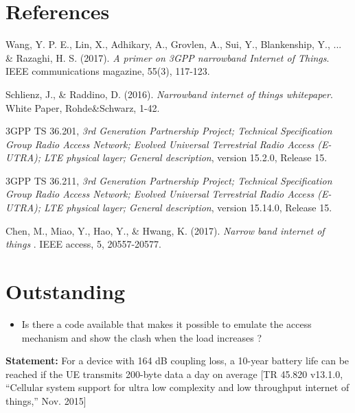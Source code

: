 \documentclass[10pt,a4paper,titlepage,twoside]{article}
\newcommand{\hghlght}[1]{\textbf{\color{ymaorng} #1}}
\newcommand{\point}[1]{\textbf{\color{ymared} #1}}
\begin{document}
\clearpage
\section{References}

\begin{thebibliography}{4}
Wang, Y. P. E., Lin, X., Adhikary, A., Grovlen, A., Sui, Y., Blankenship, Y., ... \& Razaghi, H. S. (2017).
\textit{A primer on 3GPP narrowband Internet of Things}. IEEE communications magazine, 55(3), 117-123.

Schlienz, J., \& Raddino, D. (2016).
\textit{Narrowband internet of things whitepaper}. White Paper, Rohde\&Schwarz, 1-42.

3GPP TS 36.201,
\textit{3rd Generation Partnership Project; Technical Specification Group Radio Access Network; Evolved Universal Terrestrial Radio Access (E-UTRA); LTE physical layer; General description}, version 15.2.0, Release 15.

3GPP TS 36.211,
\textit{3rd Generation Partnership Project; Technical Specification Group Radio Access Network; Evolved Universal Terrestrial Radio Access (E-UTRA); LTE physical layer; General description}, version 15.14.0, Release 15.

Chen, M., Miao, Y., Hao, Y., \& Hwang, K. (2017).
\textit{Narrow band internet of things}
. IEEE access, 5, 20557-20577.

\end{thebibliography}


\clearpage
\section{\point{Outstanding}}

\begin{itemize}
\item Is there a code available that makes it possible to emulate the access mechanism and show the clash when the load increases ?

\end{itemize}

\hghlght{Statement:} For a device with 164 dB coupling loss, a 10-year battery life can be reached if the UE transmits 200-byte data a day on average {[TR 45.820 v13.1.0, “Cellular system support for ultra low complexity and low throughput internet of things,” Nov. 2015]}
\end{document}
